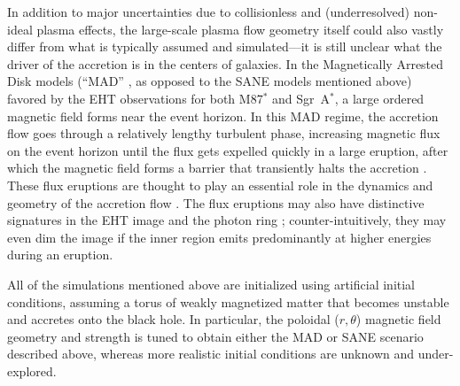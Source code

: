 \documentclass[graybox,envcountchap]{svmult}
\begin{document}
In addition to major uncertainties due to collisionless and (underresolved) non-ideal plasma effects, the large-scale plasma flow geometry itself could also vastly differ from what is typically assumed and simulated---it is still unclear what the driver of the accretion is in the centers of galaxies.
In the Magnetically Arrested Disk models (``MAD'' \cite{Igumenshchev2003,Narayan2003}, as opposed to the SANE models mentioned above) favored by the EHT observations for both M87$^*$ and Sgr~A$^*$, a large ordered magnetic field forms near the event horizon.
In this MAD regime, the accretion flow goes through a relatively lengthy turbulent phase, increasing magnetic flux on the event horizon until the flux gets expelled quickly in a large eruption, after which the magnetic field forms a barrier that transiently halts the accretion \cite{BisnovatyiKogan1974,BisnovatyiKogan1976,Narayan2003}.
These flux eruptions are thought to play an essential role in the dynamics and geometry of the accretion flow \cite{Chatterjee2022}.
The flux eruptions may also have distinctive signatures in the EHT image \cite{Jia2023,NajafiZiyazi2023} and the photon ring \cite{Gelles2022}; counter-intuitively, they may even dim the image if the inner region emits predominantly at higher energies during an eruption.

All of the simulations mentioned above are initialized using artificial initial conditions, assuming a torus of weakly magnetized matter that becomes unstable and accretes onto the black hole.
In particular, the poloidal ($r,\theta$) magnetic field geometry and strength is tuned to obtain either the MAD or SANE scenario described above, whereas more realistic initial conditions are unknown and under-explored. 
\end{document}
